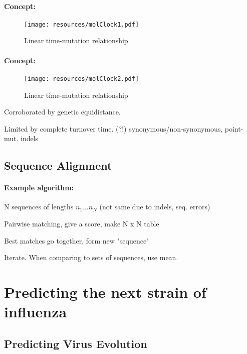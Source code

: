 \documentclass{beamer}
\begin{document}
\begin{darkframes}
    \begin{frame}{\secname}
      \framesubtitle{Concept: \subsecname}
      \begin{figure}
        \texttt{[image: resources/molClock1.pdf]}
        \caption{\footnotesize Linear time-mutation relationship}
      \end{figure}
    \end{frame}


    \begin{frame}{\secname}
      \framesubtitle{Concept: \subsecname}
      \begin{figure}
        \texttt{[image: resources/molClock2.pdf]}
        \caption{\footnotesize Linear time-mutation relationship}
      \end{figure}
      \vspace*{-.2cm}
      \footnotesize
      Corroborated by genetic equidistance.

      Limited by complete turnover time. (?!) synonymous/non-synonymous, point-mut. indels
    \end{frame}

    \subsection{Sequence Alignment}

    \begin{frame}{\secname}
      \framesubtitle{Example algorithm: \subsecname}

      N sequences of lengths $n_1 ... n_N$ (not same due to indels, seq. errors)

      Pairwise matching, give a score, make N x N table

      Best matches go together, form new "sequence"

      Iterate. When comparing to sets of sequences, use mean.

    \end{frame}






  \section{Predicting the next strain of influenza}



    \subsection{Predicting Virus Evolution}


\end{darkframes}
\end{document}
